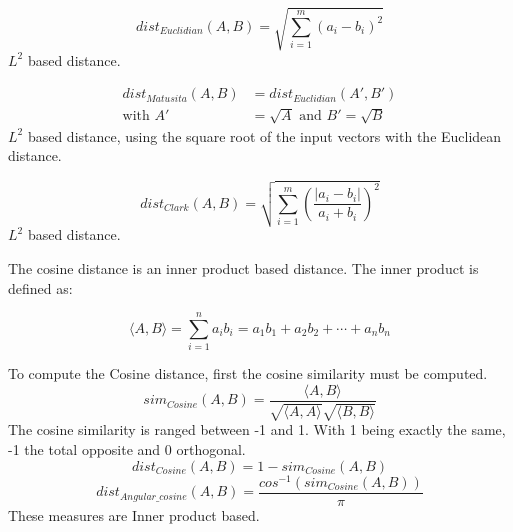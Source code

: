 \begin{definition}
  \begin{equation}
    dist_{Euclidian}(A, B) = \sqrt{\sum_{i=1}^{m}(a_i - b_i)^2}
  \end{equation}
  $L^2$ based distance.
\end{definition}

\begin{definition}
  \begin{equation}
    \begin{split}
      dist_{Matusita}(A, B) &= dist_{Euclidian}(A', B') \\
      \text{with }A' &= \sqrt{A}\text{ and }B' = \sqrt{B}
    \end{split}
  \end{equation}
  $L^2$ based distance, using the square root of the input vectors with the Euclidean distance.
\end{definition}

\begin{definition}
  \begin{equation}
    dist_{Clark}(A, B) = \sqrt{\sum_{i=1}^{m}\left(\frac{|a_i - b_i|}{a_i + b_i}\right)^2}
  \end{equation}
  $L^2$ based distance.
\end{definition}

\begin{definition}
  \label{def:cosine_dist}
  The cosine distance is an inner product based distance.
  The inner product is defined as:

  \begin{equation}
    \langle A, B \rangle = \sum_{i=1}^{n} a_i b_i = a_1 b_1 + a_2 b_2 + \cdots + a_n b_n
  \end{equation}

  To compute the Cosine distance, first the cosine similarity must be computed.
  \begin{equation}
    sim_{Cosine}(A, B) = \frac{\langle A, B \rangle}{\sqrt{\langle A , A \rangle}\sqrt{\langle B, B \rangle}}
  \end{equation}
  The cosine similarity is ranged between -1 and 1.
  With 1 being exactly the same, -1 the total opposite and 0 orthogonal.
  \begin{equation}
    dist_{Cosine}(A, B) = 1 - sim_{Cosine}(A, B)
  \end{equation}
  \begin{equation}
    dist_{Angular\_cosine}(A, B) = \frac{cos^{-1}\left( sim_{Cosine}(A, B) \right)}{\pi}
  \end{equation}
  These measures are Inner product based.
\end{definition}

